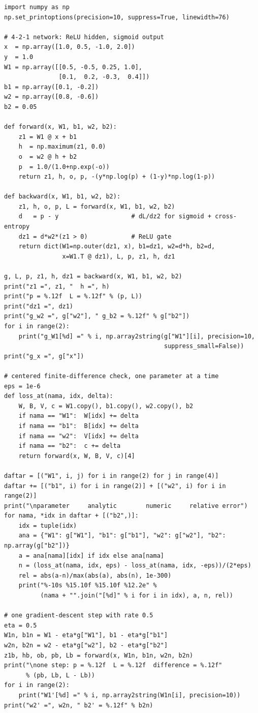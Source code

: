 \begin{lab}
\begin{verbatim}
import numpy as np
np.set_printoptions(precision=10, suppress=True, linewidth=76)

# 4-2-1 network: ReLU hidden, sigmoid output
x  = np.array([1.0, 0.5, -1.0, 2.0])
y  = 1.0
W1 = np.array([[0.5, -0.5, 0.25, 1.0],
               [0.1,  0.2, -0.3,  0.4]])
b1 = np.array([0.1, -0.2])
w2 = np.array([0.8, -0.6])
b2 = 0.05

def forward(x, W1, b1, w2, b2):
    z1 = W1 @ x + b1
    h  = np.maximum(z1, 0.0)
    o  = w2 @ h + b2
    p  = 1.0/(1.0+np.exp(-o))
    return z1, h, o, p, -(y*np.log(p) + (1-y)*np.log(1-p))

def backward(x, W1, b1, w2, b2):
    z1, h, o, p, L = forward(x, W1, b1, w2, b2)
    d   = p - y                    # dL/dz2 for sigmoid + cross-entropy
    dz1 = d*w2*(z1 > 0)            # ReLU gate
    return dict(W1=np.outer(dz1, x), b1=dz1, w2=d*h, b2=d,
                x=W1.T @ dz1), L, p, z1, h, dz1

g, L, p, z1, h, dz1 = backward(x, W1, b1, w2, b2)
print("z1 =", z1, "  h =", h)
print("p = %.12f  L = %.12f" % (p, L))
print("dz1 =", dz1)
print("g_w2 =", g["w2"], " g_b2 = %.12f" % g["b2"])
for i in range(2):
    print("g_W1[%d] =" % i, np.array2string(g["W1"][i], precision=10,
                                            suppress_small=False))
print("g_x =", g["x"])

# centered finite-difference check, one parameter at a time
eps = 1e-6
def loss_at(nama, idx, delta):
    W, B, V, c = W1.copy(), b1.copy(), w2.copy(), b2
    if nama == "W1":  W[idx] += delta
    if nama == "b1":  B[idx] += delta
    if nama == "w2":  V[idx] += delta
    if nama == "b2":  c += delta
    return forward(x, W, B, V, c)[4]

daftar = [("W1", i, j) for i in range(2) for j in range(4)]
daftar += [("b1", i) for i in range(2)] + [("w2", i) for i in range(2)]
print("\nparameter     analytic        numeric     relative error")
for nama, *idx in daftar + [("b2",)]:
    idx = tuple(idx)
    ana = {"W1": g["W1"], "b1": g["b1"], "w2": g["w2"], "b2": np.array(g["b2"])}
    a = ana[nama][idx] if idx else ana[nama]
    n = (loss_at(nama, idx, eps) - loss_at(nama, idx, -eps))/(2*eps)
    rel = abs(a-n)/max(abs(a), abs(n), 1e-300)
    print("%-10s %15.10f %15.10f %12.2e" %
          (nama + "".join("[%d]" % i for i in idx), a, n, rel))

# one gradient-descent step with rate 0.5
eta = 0.5
W1n, b1n = W1 - eta*g["W1"], b1 - eta*g["b1"]
w2n, b2n = w2 - eta*g["w2"], b2 - eta*g["b2"]
z1b, hb, ob, pb, Lb = forward(x, W1n, b1n, w2n, b2n)
print("\none step: p = %.12f  L = %.12f  difference = %.12f"
      % (pb, Lb, L - Lb))
for i in range(2):
    print("W1'[%d] =" % i, np.array2string(W1n[i], precision=10))
print("w2' =", w2n, " b2' = %.12f" % b2n)


\end{verbatim}
\end{lab}
